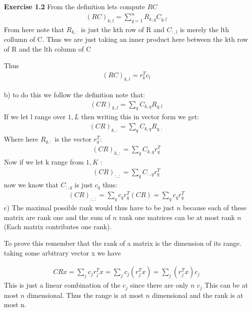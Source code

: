 \documentclass[12pt]{article}
\newenvironment{exercise}[1]{\vspace{.1in}\noindent\textbf{Exercise #1 \hspace{.05em}}}{}
\begin{document}
\begin{exercise}{1.2}
	From the definition lets compute $RC$
	\begin{align}
		(RC)_{k,l} = \sum_{q=1}^{n}R_{k,q}C_{q,l}
	\end{align}
	From here note that $R_{k,:}$ is just the kth row of R and $C_{:,l}$ is merely the lth collumn of C. Thus we are just taking an inner product here between the kth row of R and the lth column of C

	Thus
	\begin{align}
		(RC)_{k,l} =r_k^Tc_l
	\end{align}

	b) to do this we follow the definition note that:
	\begin{align}
		(CR)_{k,l} = \sum_q C_{k,q}R_{q,l}
	\end{align}
	If we let l range over $1,L$ then writing this in vector form we get:
	\begin{align}
		(CR)_{k,:} = \sum_q C_{k,q}R_{q,:}
	\end{align}
	Where here $R_{q,:}$ is the vector $r_q^T$:
	\begin{align}
		(CR)_{k,:} = \sum_q C_{k,q}r_q^T
	\end{align}
	Now if we let k range from $1,K$
	:
	\begin{align}
		(CR)_{:,:} = \sum_q C_{:,q}r_q^T
	\end{align}
	now we know that $ C_{:,q}$ is just $c_q$ thus:
	\begin{align}
		(CR)_{:,:} = \sum_q c_{q}r_q^T
		(CR) = \sum_q c_{q}r_q^T
	\end{align}
	c) The maximal possible rank would thus have to be just $n$ because each of these matrix are rank one and the sum of $n$ rank one matrices can be at most rank $n$ (Each matrix contributes one rank).

	To prove this remember that the rank of a matrix is the dimension of its range. taking some arbitrary vector x we have

	\begin{align}
		CRx=\sum_{j}c_jr_j^Tx
		=\sum_{j}c_j(r_j^Tx)
		=\sum_{j}(r_j^Tx)c_j
	\end{align}
	This is just a linear combination of the $c_j$ since there are only $n$ $c_j$ This can be at most $n$ dimensional. Thus the range is at most $n$ dimensional and the rank is at most n.
\end{exercise}
\end{document}
